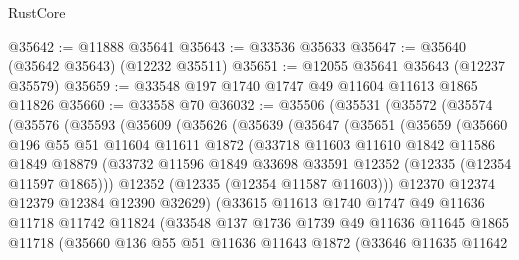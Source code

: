\begin{lexlean}{RustCore}
\begin{coremodule}
@35642 := @11888 @35641
@35643 := @33536 @35633
@35647 := @35640 (@35642 @35643) (@12232 @35511)
@35651 := @12055 @35641 @35643 (@12237 @35579)
@35659 := @33548 @197 @1740 @1747 @49 @11604 @11613 @1865 @11826
@35660 := @33558 @70
@36032 := @35506
    (@35531
      (@35572
        (@35574
          (@35576
            (@35593
              (@35609
                (@35626
                  (@35639
                    (@35647
                      (@35651
                        (@35659
                          (@35660
                            @196
                            @55
                            @51
                            @11604
                            @11611
                            @1872
                            (@33718
                              @11603
                              @11610
                              @1842
                              @11586
                              @1849
                              @18879
                              (@33732
                                @11596
                                @1849
                                @33698
                                @33591
                                @12352
                                (@12335 (@12354 @11597 @1865)))
                              @12352
                              (@12335 (@12354 @11587 @11603)))
                            @12370
                            @12374
                            @12379
                            @12384
                            @12390
                            @32629)
                          (@33615
                            @11613
                            @1740
                            @1747
                            @49
                            @11636
                            @11718
                            @11742
                            @11824
                            (@33548
                              @137
                              @1736
                              @1739
                              @49
                              @11636
                              @11645
                              @1865
                              @11718
                              (@35660
                                @136
                                @55
                                @51
                                @11636
                                @11643
                                @1872
                                (@33646
                                  @11635
                                  @11642

\end{coremodule}
\end{lexlean}

